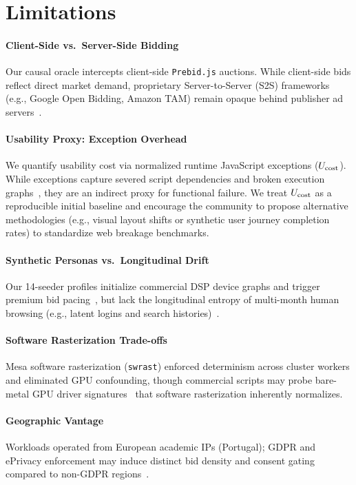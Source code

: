 \section{Limitations}
\label{sec:threats}

\paragraph{Client-Side vs.\ Server-Side Bidding}
Our causal oracle intercepts client-side \texttt{Prebid.js} auctions. While client-side bids reflect direct market demand, proprietary Server-to-Server (S2S) frameworks (e.g., Google Open Bidding, Amazon TAM) remain opaque behind publisher ad servers~\cite{pachilakis2019no, cook2020inferring}.

\paragraph{Usability Proxy: Exception Overhead}
We quantify usability cost via normalized runtime JavaScript exceptions ($U_{\text{cost}}$). While exceptions capture severed script dependencies and broken execution graphs~\cite{iqbal2020adgraph}, they are an indirect proxy for functional failure. 
We treat $U_{\text{cost}}$ as a reproducible initial baseline and encourage the community to propose alternative methodologies (e.g., visual layout shifts or synthetic user journey completion rates) to standardize web breakage benchmarks.

\paragraph{Synthetic Personas vs.\ Longitudinal Drift}
Our 14-seeder profiles initialize commercial DSP device graphs and trigger premium bid pacing~\cite{bashir2016tracing, oh2022cart}, but lack the longitudinal entropy of multi-month human browsing (e.g., latent logins and search histories)~\cite{zeber2020representativeness, lerner2016internet}.

\paragraph{Software Rasterization Trade-offs}
Mesa software rasterization (\texttt{swrast}) enforced determinism across cluster workers and eliminated GPU confounding, though commercial scripts may probe bare-metal GPU driver signatures~\cite{mowery2012pixel, cao2017cross} that software rasterization inherently normalizes.

\paragraph{Geographic Vantage}
Workloads operated from European academic IPs (Portugal); GDPR and ePrivacy enforcement may induce distinct bid density and consent gating compared to non-GDPR regions~\cite{papadogiannakis2021user, barysei2023investigating}.